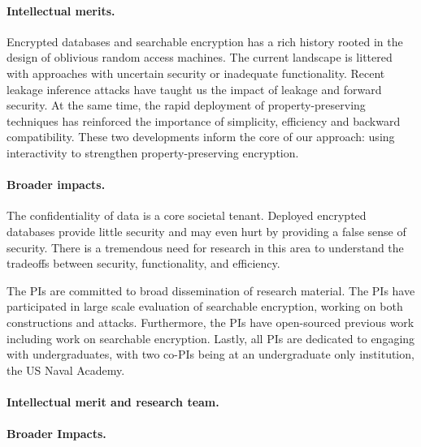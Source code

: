 \paragraph{Intellectual merits.}  
Encrypted databases and searchable encryption has a rich history rooted in the
design of oblivious random access machines.  The current landscape is littered
with approaches with uncertain security or inadequate functionality.  Recent
leakage inference attacks have taught us the impact of leakage and forward
security.  At the same time, the rapid deployment of property-preserving
techniques has reinforced the importance of simplicity, efficiency and backward
compatibility.  These two developments inform the core of our approach: using
interactivity to strengthen property-preserving encryption.

\paragraph{Broader impacts.}
The confidentiality of data is a core societal tenant.  Deployed encrypted
databases provide little security and may even hurt by providing a false sense
of security.  There is a tremendous need for research in this area to
understand the tradeoffs between security, functionality, and efficiency.

The PIs are committed to broad dissemination of research material.  The PIs
have participated in large scale evaluation of searchable encryption, working
on both constructions and attacks.  Furthermore, the PIs have open-sourced
previous work including work on searchable encryption.  Lastly, all PIs are
dedicated to engaging with undergraduates, with two co-PIs being at an
undergraduate only institution, the US Naval Academy.  



\paragraph*{Intellectual merit and research team.}  

 \paragraph*{Broader Impacts.}


